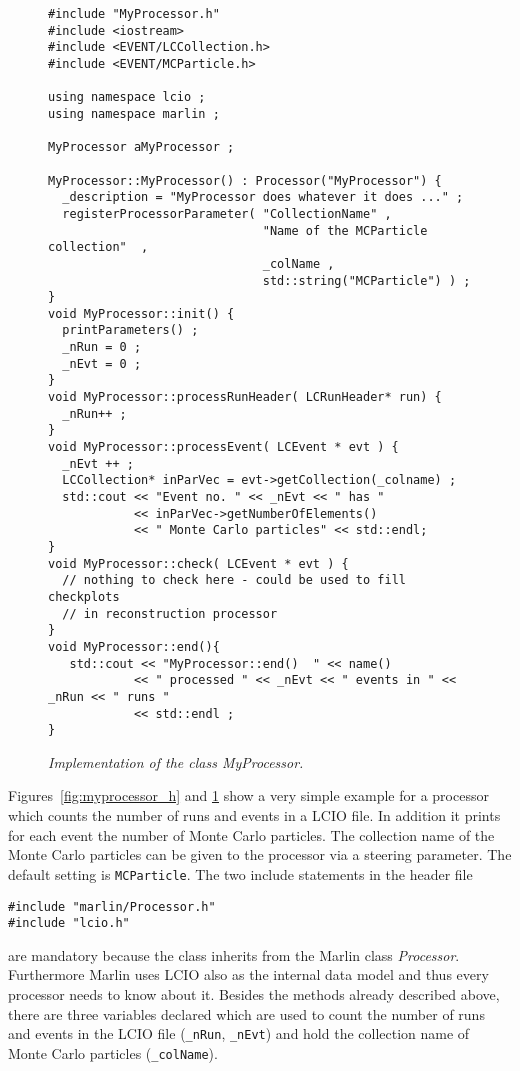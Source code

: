 \begin{figure}
\begin{verbatim}
#include "MyProcessor.h"
#include <iostream>
#include <EVENT/LCCollection.h>
#include <EVENT/MCParticle.h>

using namespace lcio ;
using namespace marlin ;

MyProcessor aMyProcessor ;

MyProcessor::MyProcessor() : Processor("MyProcessor") {
  _description = "MyProcessor does whatever it does ..." ;
  registerProcessorParameter( "CollectionName" ,
                              "Name of the MCParticle collection"  ,
                              _colName ,
                              std::string("MCParticle") ) ;
}
void MyProcessor::init() {
  printParameters() ;
  _nRun = 0 ;
  _nEvt = 0 ;
}
void MyProcessor::processRunHeader( LCRunHeader* run) {
  _nRun++ ;
}
void MyProcessor::processEvent( LCEvent * evt ) {
  _nEvt ++ ;
  LCCollection* inParVec = evt->getCollection(_colname) ;
  std::cout << "Event no. " << _nEvt << " has "
            << inParVec->getNumberOfElements()
            << " Monte Carlo particles" << std::endl;
}
void MyProcessor::check( LCEvent * evt ) {
  // nothing to check here - could be used to fill checkplots
  // in reconstruction processor
}
void MyProcessor::end(){
   std::cout << "MyProcessor::end()  " << name()
            << " processed " << _nEvt << " events in " << _nRun << " runs "
            << std::endl ;
}
\end{verbatim}
\caption{\label{fig:myprocessor_cc}
\em Implementation of the class {\em MyProcessor}.
}
\end{figure}

Figures~\ref{fig:myprocessor_h} and \ref{fig:myprocessor_cc}
show a very simple example for a processor which counts the number of runs and
events in a LCIO file. In addition it prints for each event the number of
Monte Carlo particles. The collection name of the Monte Carlo particles
can be given to the processor via a steering parameter. The default setting is
{\tt MCParticle}. The two include statements in the header file

\begin{verbatim}
#include "marlin/Processor.h"
#include "lcio.h"
\end{verbatim}

are mandatory because the class inherits from the Marlin class
{\em Processor}. Furthermore Marlin uses LCIO also as the internal data model
and thus every processor needs to know about it.
Besides the methods already described above, there are three variables
declared which are used to count the number of runs and events in the
LCIO file ({\tt \_nRun}, {\tt \_nEvt}) and hold the collection name of
Monte Carlo particles ({\tt \_colName}).

